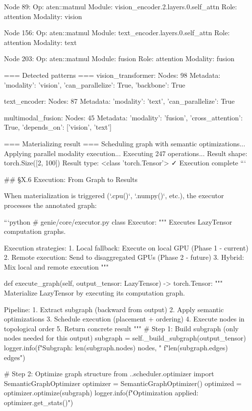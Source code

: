 Node 89:
  Op: aten::matmul
  Module: vision_encoder.2.layers.0.self_attn
  Role: attention
  Modality: vision

Node 156:
  Op: aten::matmul
  Module: text_encoder.layers.0.self_attn
  Role: attention
  Modality: text

Node 203:
  Op: aten::matmul
  Module: fusion
  Role: attention
  Modality: fusion

=== Detected patterns ===
vision_transformer:
  Nodes: 98
  Metadata: {'modality': 'vision', 'can_parallelize': True, 'backbone': True}

text_encoder:
  Nodes: 87
  Metadata: {'modality': 'text', 'can_parallelize': True}

multimodal_fusion:
  Nodes: 45
  Metadata: {'modality': 'fusion', 'cross_attention': True, 
             'depends_on': ['vision', 'text']}

=== Materializing result ===
Scheduling graph with semantic optimizations...
Applying parallel modality execution...
Executing 247 operations...
Result shape: torch.Size([2, 100])
Result type: <class 'torch.Tensor'>
✓ Execution complete
```

## §X.6 Execution: From Graph to Results

When materialization is triggered (`.cpu()`, `.numpy()`, etc.), the executor processes the annotated graph:

```python
# genie/core/executor.py
class Executor:
    """
    Executes LazyTensor computation graphs.
    
    Execution strategies:
    1. Local fallback: Execute on local GPU (Phase 1 - current)
    2. Remote execution: Send to disaggregated GPUs (Phase 2 - future)
    3. Hybrid: Mix local and remote execution
    """
    
    def execute_graph(self, output_tensor: LazyTensor) -> torch.Tensor:
        """
        Materialize LazyTensor by executing its computation graph.
        
        Pipeline:
        1. Extract subgraph (backward from output)
        2. Apply semantic optimizations
        3. Schedule execution (placement + ordering)
        4. Execute nodes in topological order
        5. Return concrete result
        """
        # Step 1: Build subgraph (only nodes needed for this output)
        subgraph = self._build_subgraph(output_tensor)
        logger.info(f"Subgraph: {len(subgraph.nodes)} nodes, "
                   f"{len(subgraph.edges)} edges")
        
        # Step 2: Optimize graph structure
        from ..scheduler.optimizer import SemanticGraphOptimizer
        optimizer = SemanticGraphOptimizer()
        optimized = optimizer.optimize(subgraph)
        logger.info(f"Optimization applied: {optimizer.get_stats()}")
        
